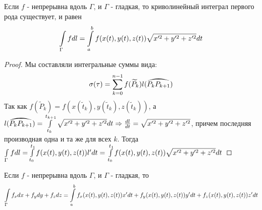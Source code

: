 \begin{theorem}
	Если $f$ - непрерывна вдоль $\Gamma$, и $\Gamma$ - гладкая, 
	то криволинейный интеграл первого рода существует, и равен
	\begin{gather*}
		\int\limits_{\Gamma}f dl = \int\limits_{a}^{b} f(x(t), y(t), z(t))\sqrt{x'^2 + y'^2 + z'^2} dt
	\end{gather*}
	
	\begin{proof}
		Мы составляли интегральные суммы вида:
		\begin{gather*}
			\sigma(\tau) = \sumlr{k = 0}{n - 1} f(\widetilde{P}_k)l(\wideparen{P_k P_{k + 1}})
		\end{gather*}
		Так как $f(\widetilde{P}_k) = f(x(\widetilde{t}_k), y(\widetilde{t}_k), z(\widetilde{t}_k))$, 
		а $l(\wideparen{P_k P_{k + 1}}) = \intlr{t_k}{t_{k + 1}} \sqrt{x'^2 + y'^2 + z'^2}dt 
		\Rightarrow \frac{dl}{dt} = \sqrt{x'^2 + y'^2 + z'^2}$, причем последняя производная 
		одна и та же для всех $k$. Тогда
		$\int\limits_{\Gamma} fdl = \int\limits_{t_0}^{t_1} f(x(t), y(t), z(t))l' dt =\\
		\int\limits_{t_0}^{t_1} f(x(t), y(t), z(t))\sqrt{x'^2 + y'^2 + z'^2} dt $
	\end{proof}
\end{theorem}

\begin{theorem}
	Если $f$ - непрерывна вдоль $\Gamma$, и $\Gamma$ - гладкая, то 
	\begin{gather*}
		\int\limits_{\Gamma} f_x dx + f_ydy + f_zdz = 
		\int\limits_{a}^{b} f_x(x(t), y(t), z(t))x' dt + 
					f_y(x(t), y(t), z(t))y' dt +
					f_z(x(t), y(t), z(t))z' dt
	\end{gather*}
\end{theorem}

